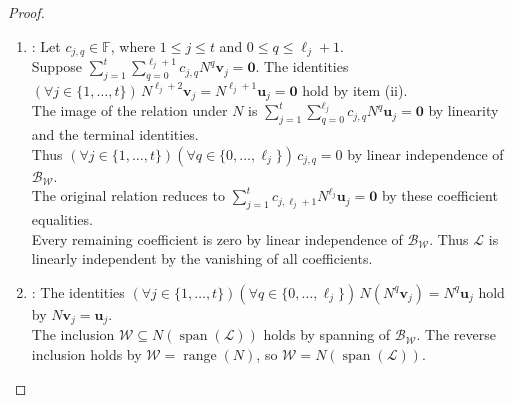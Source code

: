 \begin{theorem}
\begin{proof}
\begin{enumerate}[label=(\roman*)]
Set $\mathcal{W}\defeq\operatorname{range}(N)$. The restriction $N|_{\mathcal{W}}$ is nilpotent by $N(\mathcal{W})\subseteq\mathcal{W}$ and $(N|_{\mathcal{W}})^n=0$.\\
Choose $t\in\mathbb{Z}_{\geq0}$, $\mathbf{u}=(\mathbf{u}_j)_{j=1}^{t}\in\mathcal{W}^t$, and $\boldsymbol{\ell}=(\ell_j)_{j=1}^{t}\in\mathbb{Z}_{\geq0}^t$ by the induction hypothesis for $N|_{\mathcal{W}}$.\\
Set $\mathcal{B}_{\mathcal{W}}\defeq(\mathcal{C}_N(\mathbf{u}_j,\ell_j))_{j=1}^{t}$. This is a basis of $\mathcal{W}$ by equality of restriction powers and the induction hypothesis.\\
The identities $(\forall j\in\{1,\ldots,t\})\,N^{\ell_j+1}\mathbf{u}_j=\mathbf{0}$ hold by the same facts.\\
For $j\in\{1,\ldots,t\}$, choose $\mathbf{v}_j\in\mathcal{V}$ satisfying $N\mathbf{v}_j=\mathbf{u}_j$ by $\mathbf{u}_j\in\operatorname{range}(N)$. Set $\mathcal{L}\defeq(\mathcal{C}_N(\mathbf{v}_j,\ell_j+1))_{j=1}^{t}$.
\item {}: Let $c_{j,q}\in\mathbb{F}$, where $1\leq j\leq t$ and $0\leq q\leq\ell_j+1$.\\
Suppose $\sum\limits_{j=1}^{t}\sum\limits_{q=0}^{\ell_j+1}c_{j,q}N^q\mathbf{v}_j=\mathbf{0}$. The identities $(\forall j\in\{1,\ldots,t\})\,N^{\ell_j+2}\mathbf{v}_j=N^{\ell_j+1}\mathbf{u}_j=\mathbf{0}$ hold by item (ii).\\
The image of the relation under $N$ is $\sum\limits_{j=1}^{t}\sum\limits_{q=0}^{\ell_j}c_{j,q}N^q\mathbf{u}_j=\mathbf{0}$ by linearity and the terminal identities.\\
Thus $(\forall j\in\{1,\ldots,t\})(\forall q\in\{0,\ldots,\ell_j\})\,c_{j,q}=0$ by linear independence of $\mathcal{B}_{\mathcal{W}}$.\\
The original relation reduces to $\sum\limits_{j=1}^{t}c_{j,\ell_j+1}N^{\ell_j}\mathbf{u}_j=\mathbf{0}$ by these coefficient equalities.\\
Every remaining coefficient is zero by linear independence of $\mathcal{B}_{\mathcal{W}}$. Thus $\mathcal{L}$ is linearly independent by the vanishing of all coefficients.
\item {}: The identities $(\forall j\in\{1,\ldots,t\})(\forall q\in\{0,\ldots,\ell_j\})\,N(N^q\mathbf{v}_j)=N^q\mathbf{u}_j$ hold by $N\mathbf{v}_j=\mathbf{u}_j$.\\
The inclusion $\mathcal{W}\subseteq N(\operatorname{span}(\mathcal{L}))$ holds by spanning of $\mathcal{B}_{\mathcal{W}}$. The reverse inclusion holds by $\mathcal{W}=\operatorname{range}(N)$, so $\mathcal{W}=N(\operatorname{span}(\mathcal{L}))$.\\

\end{enumerate}
\end{proof}
\end{theorem}
